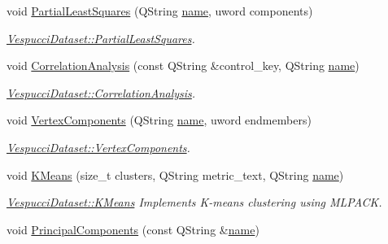 \begin{DoxyCompactItemize}
\item 
void \hyperlink{class_vespucci_dataset_a35e88aff315baed00bd00abdd117af76}{Partial\+Least\+Squares} (Q\+String \hyperlink{class_vespucci_dataset_a345a51b60127316b41caf92dc88fd792}{name}, uword components)
\begin{DoxyCompactList}\small\item\em \hyperlink{class_vespucci_dataset_a35e88aff315baed00bd00abdd117af76}{Vespucci\+Dataset\+::\+Partial\+Least\+Squares}. \end{DoxyCompactList}\item 
void \hyperlink{class_vespucci_dataset_ab4294f0b9fc97e065e4a95049387c7df}{Correlation\+Analysis} (const Q\+String \&control\+\_\+key, Q\+String \hyperlink{class_vespucci_dataset_a345a51b60127316b41caf92dc88fd792}{name})
\begin{DoxyCompactList}\small\item\em \hyperlink{class_vespucci_dataset_ab4294f0b9fc97e065e4a95049387c7df}{Vespucci\+Dataset\+::\+Correlation\+Analysis}. \end{DoxyCompactList}\item 
void \hyperlink{class_vespucci_dataset_a2d42caf2021c7a159290f1e265507386}{Vertex\+Components} (Q\+String \hyperlink{class_vespucci_dataset_a345a51b60127316b41caf92dc88fd792}{name}, uword endmembers)
\begin{DoxyCompactList}\small\item\em \hyperlink{class_vespucci_dataset_a2d42caf2021c7a159290f1e265507386}{Vespucci\+Dataset\+::\+Vertex\+Components}. \end{DoxyCompactList}\item 
void \hyperlink{class_vespucci_dataset_a66187dec3aeafb655e75d7be5af7f52d}{K\+Means} (size\+\_\+t clusters, Q\+String metric\+\_\+text, Q\+String \hyperlink{class_vespucci_dataset_a345a51b60127316b41caf92dc88fd792}{name})
\begin{DoxyCompactList}\small\item\em \hyperlink{class_vespucci_dataset_a66187dec3aeafb655e75d7be5af7f52d}{Vespucci\+Dataset\+::\+K\+Means} Implements K-\/means clustering using M\+L\+P\+A\+CK. \end{DoxyCompactList}\item 
void \hyperlink{class_vespucci_dataset_afda2b2b227ccea9e472b5cdfea305231}{Principal\+Components} (const Q\+String \&\hyperlink{class_vespucci_dataset_a345a51b60127316b41caf92dc88fd792}{name})\hypertarget{class_vespucci_dataset_afda2b2b227ccea9e472b5cdfea305231}{}\label{class_vespucci_dataset_afda2b2b227ccea9e472b5cdfea305231}


\end{DoxyCompactItemize}

